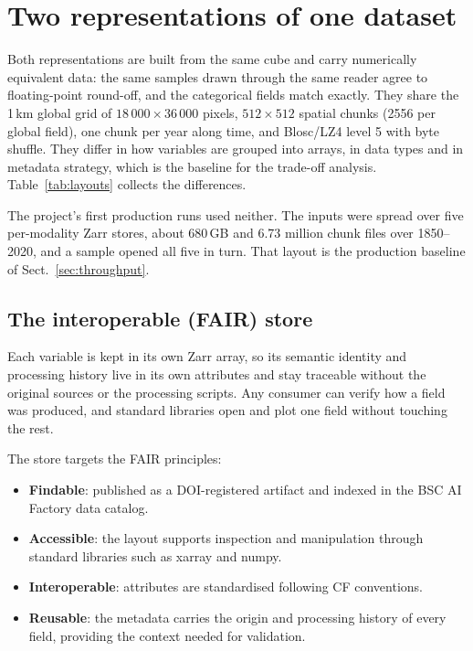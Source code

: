 \documentclass[gmd, manuscript]{copernicus}
\begin{document}
\section{Two representations of one dataset}
\label{sec:two-reps}

Both representations are built from the same cube and carry numerically equivalent data: the
same samples drawn through the same reader agree to floating-point round-off, and the
categorical fields match exactly. They share the 1\,km global grid of
$18\,000 \times 36\,000$ pixels, $512 \times 512$ spatial chunks (2556 per global field), one
chunk per year along time, and Blosc/LZ4 level 5 with byte shuffle. They differ in how
variables are grouped into arrays, in data types and in metadata strategy, which is the
baseline for the trade-off analysis. Table~\ref{tab:layouts} collects the differences.

The project's first production runs used neither. The inputs were spread over five
per-modality Zarr stores, about 680\,GB and 6.73 million chunk files over 1850--2020, and a
sample opened all five in turn. That layout is the production baseline of
Sect.~\ref{sec:throughput}.

\subsection{The interoperable (FAIR) store}
\label{sec:fair-store}

Each variable is kept in its own Zarr array, so its semantic identity and processing history
live in its own attributes and stay traceable without the original sources or the processing
scripts. Any consumer can verify how a field was produced, and standard libraries open and
plot one field without touching the rest.

The store targets the FAIR principles:
\begin{itemize}
    \item \textbf{Findable}: published as a DOI-registered artifact \cite{doi_ref} and indexed
      in the BSC AI Factory data catalog.
    \item \textbf{Accessible}: the layout supports inspection and manipulation through
      standard libraries such as xarray \citep{xarray} and numpy.
    \item \textbf{Interoperable}: attributes are standardised following CF conventions.
    \item \textbf{Reusable}: the metadata carries the origin and processing history of every
      field, providing the context needed for validation.
\end{itemize}
\end{document}
